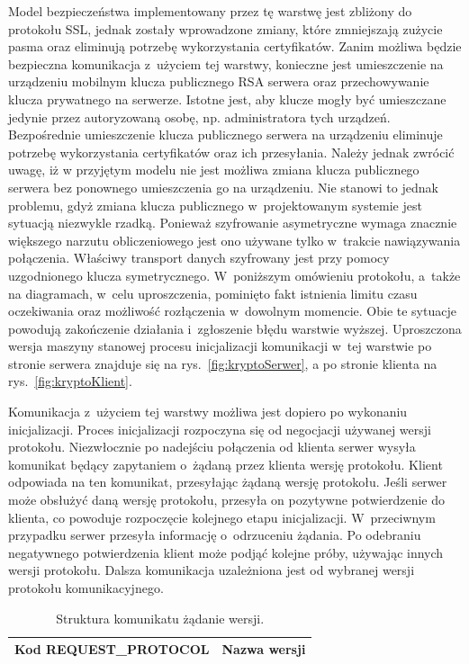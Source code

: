 Model bezpieczeństwa implementowany przez tę warstwę jest zbliżony do
protokołu SSL, jednak zostały wprowadzone zmiany, które zmniejszają
zużycie pasma oraz eliminują potrzebę wykorzystania
certyfikatów. Zanim możliwa będzie bezpieczna komunikacja z~użyciem
tej warstwy, konieczne jest umieszczenie na urządzeniu mobilnym klucza
publicznego RSA serwera oraz przechowywanie klucza prywatnego na
serwerze. Istotne jest, aby klucze mogły być umieszczane jedynie przez
autoryzowaną osobę, np. administratora tych urządzeń. Bezpośrednie
umieszczenie klucza publicznego serwera na urządzeniu eliminuje
potrzebę wykorzystania certyfikatów oraz ich przesyłania. Należy
jednak zwrócić uwagę, iż w przyjętym modelu nie jest możliwa zmiana
klucza publicznego serwera bez ponownego umieszczenia go na
urządzeniu. Nie stanowi to jednak problemu, gdyż zmiana klucza
publicznego w~projektowanym systemie jest sytuacją niezwykle
rzadką. Ponieważ szyfrowanie asymetryczne wymaga znacznie większego
narzutu obliczeniowego jest ono używane tylko w~trakcie nawiązywania
połączenia. Właściwy transport danych szyfrowany jest przy pomocy
uzgodnionego klucza symetrycznego. W~poniższym omówieniu protokołu,
a~także na diagramach, w~celu uproszczenia, pominięto fakt istnienia
limitu czasu oczekiwania oraz możliwość rozłączenia w~dowolnym
momencie. Obie te sytuacje powodują zakończenie działania i~zgłoszenie
błędu warstwie wyższej. Uproszczona wersja maszyny stanowej procesu
inicjalizacji komunikacji w~tej warstwie po stronie serwera znajduje
się na rys.~\ref{fig:kryptoSerwer}, a po stronie klienta na
rys.~\ref{fig:kryptoKlient}.

Komunikacja z~użyciem tej warstwy możliwa jest dopiero po wykonaniu
inicjalizacji. Proces inicjalizacji rozpoczyna się od negocjacji
używanej wersji protokołu. Niezwłocznie po nadejściu połączenia od
klienta serwer wysyła komunikat będący zapytaniem o~żądaną przez
klienta wersję protokołu. Klient odpowiada na ten komunikat,
przesyłając żądaną wersję protokołu. Jeśli serwer może obsłużyć daną
wersję protokołu, przesyła on pozytywne potwierdzenie do klienta, co
powoduje rozpoczęcie kolejnego etapu inicjalizacji. W~przeciwnym
przypadku serwer przesyła informację o~odrzuceniu żądania. Po
odebraniu negatywnego potwierdzenia klient może podjąć kolejne próby,
używając innych wersji protokołu. Dalsza komunikacja uzależniona jest
od wybranej wersji protokołu komunikacyjnego.

\begin{table}[H]
\centering
\caption{Struktura komunikatu żądanie wersji.}

\begin{tabular}{|p{5cm}|p{6cm}|}
\hline
\raggedright{Kod REQUEST\_PROTOCOL} & Nazwa wersji\\
\hline
\end{tabular}
\end{table}

